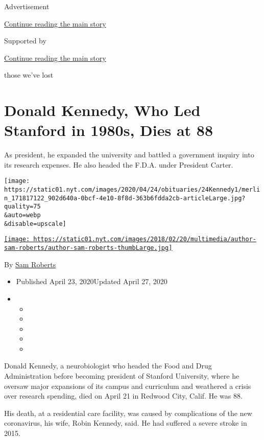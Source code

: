 Advertisement

\protect\hyperlink{after-top}{Continue reading the main story}

Supported by

\protect\hyperlink{after-sponsor}{Continue reading the main story}

those we've lost

\hypertarget{donald-kennedy-who-led-stanford-in-1980s-dies-at-88}{%
\section{Donald Kennedy, Who Led Stanford in 1980s, Dies at
88}\label{donald-kennedy-who-led-stanford-in-1980s-dies-at-88}}

As president, he expanded the university and battled a government
inquiry into its research expenses. He also headed the F.D.A. under
President Carter.

\texttt{[image: https://static01.nyt.com/images/2020/04/24/obituaries/24Kennedy1/merlin\_171817122\_902d640a-0bcf-4e10-8f8d-363b6fdda2cb-articleLarge.jpg?quality=75\\\&auto=webp\\\&disable=upscale]}

\href{https://www.nytimes.com/by/sam-roberts}{\texttt{[image: https://static01.nyt.com/images/2018/02/20/multimedia/author-sam-roberts/author-sam-roberts-thumbLarge.jpg]}}

By \href{https://www.nytimes.com/by/sam-roberts}{Sam Roberts}

\begin{itemize}
\item
  Published April 23, 2020Updated April 27, 2020
\item
  \begin{itemize}
  \item
  \item
  \item
  \item
  \item
  \end{itemize}
\end{itemize}

Donald Kennedy, a neurobiologist who headed the Food and Drug
Administration before becoming president of Stanford University, where
he oversaw major expansions of its campus and curriculum and weathered a
crisis over research spending, died on April 21 in Redwood City, Calif.
He was 88.

His death, at a residential care facility, was caused by complications
of the new coronavirus, his wife, Robin Kennedy, said. He had suffered a
severe stroke in 2015.

